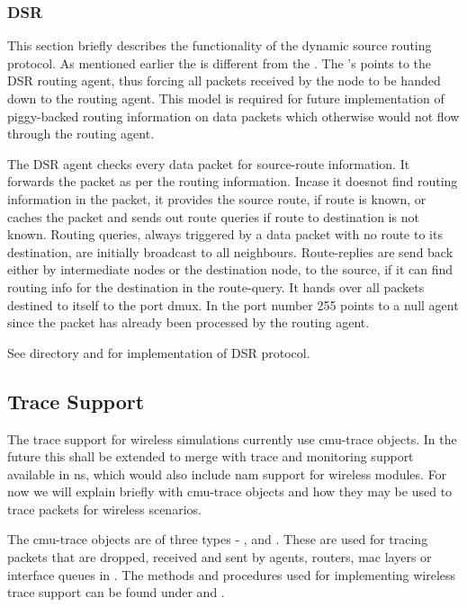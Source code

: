\subsubsection{DSR}
\label{sec:dsr}

This section briefly describes the functionality of the dynamic source
routing protocol. As mentioned earlier the  is different from
the .  The 's  points to the
DSR routing agent, thus forcing all    
packets received by the node to be handed down to the routing agent. This
model is required for future implementation of piggy-backed routing
information on data packets which otherwise would not flow through the
routing agent.   

The DSR agent checks every data packet for source-route information. It
forwards the packet as per the routing information. Incase it doesnot find
routing information in the packet, it provides the source route, if route
is known, or caches the packet and   
sends out route queries if route to destination is not known. Routing
queries, always triggered by a data packet with no route to its
destination, are initially broadcast to all neighbours. Route-replies are
send back either by intermediate nodes or the 
destination node, to the source, if it can find routing info for the
destination in the route-query.  It hands over all packets destined to
itself to the port dmux.  
In  the port number 255 points to a null agent since the
packet has already been processed by the routing agent. 

See  directory and  for implementation
of DSR protocol. 


\subsection{Trace Support}
\label{sec:mobile-trace}

The trace support for wireless simulations currently use cmu-trace
objects. In the future this shall be extended to merge with trace and
monitoring support available in ns, which would also include nam support
for wireless modules. For now we will explain briefly with cmu-trace
objects and how they may be used to trace packets for wireless scenarios. 

The cmu-trace objects are of three types - ,
 and . These are used for tracing
packets that are dropped, received and sent by agents, routers, mac layers
or interface queues in \ns. The methods and procedures used for
implementing wireless trace support can be found under
 and .

